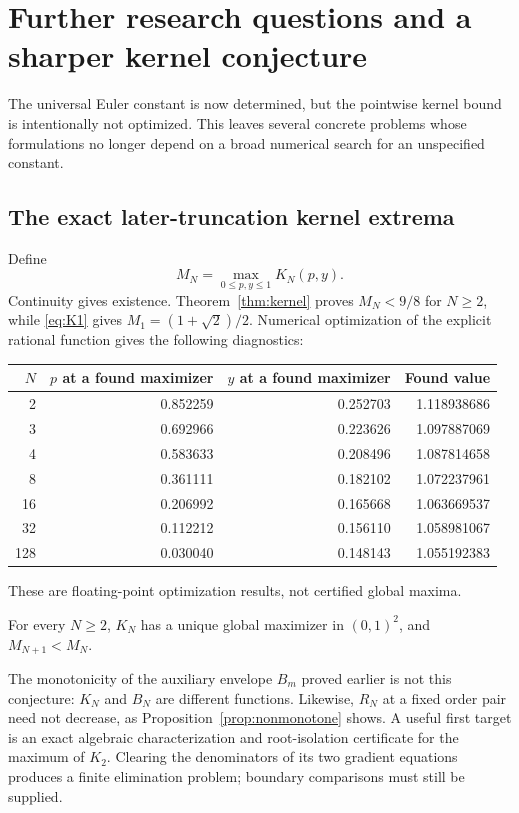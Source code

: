 \section{Further research questions and a sharper kernel conjecture}
\label{sec:questions}
The universal Euler constant is now determined, but the pointwise kernel bound is intentionally not optimized. This leaves several concrete problems whose formulations no longer depend on a broad numerical search for an unspecified constant.

\subsection{The exact later-truncation kernel extrema}
Define
\[
 M_N=\max_{0\le p,y\le1}K_N(p,y).
\]
Continuity gives existence. Theorem~\ref{thm:kernel} proves $M_N<9/8$ for $N\ge2$, while \eqref{eq:K1} gives $M_1=(1+\sqrt2)/2$. Numerical optimization of the explicit rational function gives the following diagnostics:
\begin{center}
\begin{tabular}{rrrr}
\toprule
$N$ & $p$ at a found maximizer & $y$ at a found maximizer & Found value\\
\midrule
2 & 0.852259 & 0.252703 & 1.118938686\\
3 & 0.692966 & 0.223626 & 1.097887069\\
4 & 0.583633 & 0.208496 & 1.087814658\\
8 & 0.361111 & 0.182102 & 1.072237961\\
16 & 0.206992 & 0.165668 & 1.063669537\\
32 & 0.112212 & 0.156110 & 1.058981067\\
128 & 0.030040 & 0.148143 & 1.055192383\\
\bottomrule
\end{tabular}
\end{center}
These are floating-point optimization results, not certified global maxima.

\begin{conjecture}\label{conj:maxima}
For every $N\ge2$, $K_N$ has a unique global maximizer in $(0,1)^2$, and $M_{N+1}<M_N$.
\end{conjecture}
The monotonicity of the auxiliary envelope $B_m$ proved earlier is not this conjecture: $K_N$ and $B_N$ are different functions. Likewise, $R_N$ at a fixed order pair need not decrease, as Proposition~\ref{prop:nonmonotone} shows. A useful first target is an exact algebraic characterization and root-isolation certificate for the maximum of $K_2$. Clearing the denominators of its two gradient equations produces a finite elimination problem; boundary comparisons must still be supplied.

